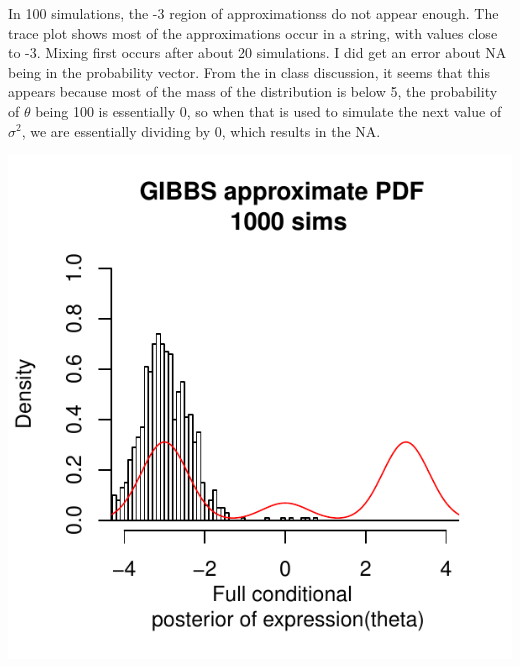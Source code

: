 \documentclass{article}\usepackage[]{graphicx}\usepackage[]{color}
\makeatletter
\def\maxwidth{ %
  \ifdim\Gin@nat@width>\linewidth
    \linewidth
  \else
    \Gin@nat@width
  \fi
}
\newenvironment{kframe}{%
 \def\at@end@of@kframe{}%
 \ifinner\ifhmode%
  \def\at@end@of@kframe{\end{minipage}}%
  \begin{minipage}{\columnwidth}%
 \fi\fi%
 \def\FrameCommand##1{\hskip\@totalleftmargin \hskip-\fboxsep
 \colorbox{shadecolor}{##1}\hskip-\fboxsep
     \hskip-\linewidth \hskip-\@totalleftmargin \hskip\columnwidth}%
 \MakeFramed {\advance\hsize-\width
   \@totalleftmargin\z@ \linewidth\hsize
   \@setminipage}}%
 {\par\unskip\endMakeFramed%
 \at@end@of@kframe}
\makeatother
\begin{document}
\begin{enumerate}
In 100 simulations, the -3 region of approximationss do not appear enough. The trace plot shows most of the approximations occur in a string, with values close to -3. Mixing first occurs after about 20 simulations. I did get an error about NA being in the probability vector. From the in class discussion, it seems that this appears because most of the mass of the distribution is below 5, the probability of $\theta$ being 100 is essentially 0, so when that is used to simulate the next value of $\sigma^2$, we are essentially dividing by 0, which results in the NA.



\begin{kframe}


{\ttfamily\noindent\bfseries\color{errorcolor}{\#\# Error in sample.int(length(x), size, replace, prob): NA in probability vector}}\end{kframe}
\includegraphics[width=\maxwidth]{figure/prob3e4-1} 


\end{enumerate}
\end{document}
